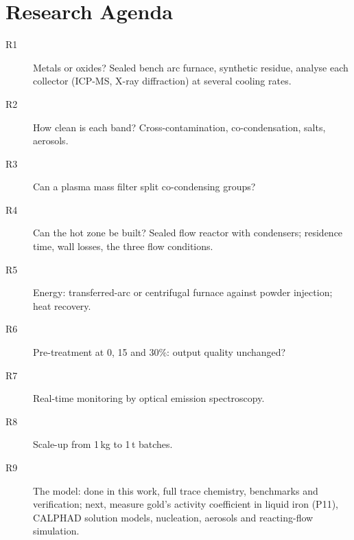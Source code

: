 \documentclass[11pt,a4paper]{article}
\begin{document}
\section{Research Agenda}
\begin{description}
\item[R1] Metals or oxides? Sealed bench arc furnace, synthetic residue, analyse each collector (ICP-MS, X-ray diffraction) at several cooling rates.
\item[R2] How clean is each band? Cross-contamination, co-condensation, salts, aerosols.
\item[R3] Can a plasma mass filter split co-condensing groups?
\item[R4] Can the hot zone be built? Sealed flow reactor with condensers; residence time, wall losses, the three flow conditions.
\item[R5] Energy: transferred-arc or centrifugal furnace against powder injection; heat recovery.
\item[R6] Pre-treatment at 0, 15 and 30\%: output quality unchanged?
\item[R7] Real-time monitoring by optical emission spectroscopy.
\item[R8] Scale-up from 1\,kg to 1\,t batches.
\item[R9] The model: done in this work, full trace chemistry, benchmarks and verification; next, measure gold's activity coefficient in liquid iron (P11), CALPHAD solution models, nucleation, aerosols and reacting-flow simulation.
\end{description}

\end{document}
